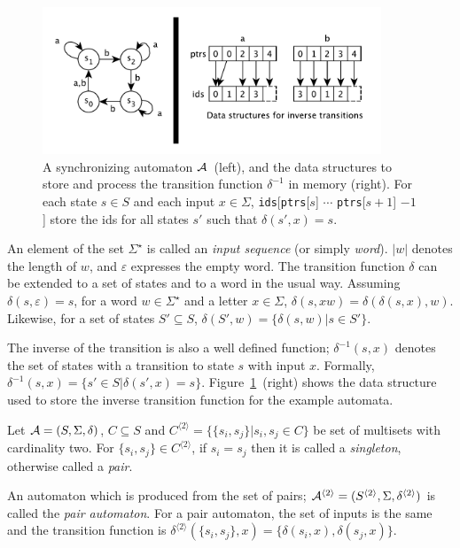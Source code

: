\documentclass[12pt]{article}
\begin{document}
\begin{figure}[ht]
	\centering
	\includegraphics[width=0.9\textwidth]{figs/inverse.pdf}
	\caption{A synchronizing automaton ${\cal A}$~(left), and the data structures to store and process the transition function $\delta^{-1}$  in memory (right).
	For each state $s \in S$ and each input $x \in \Sigma$, {\tt ids}[{\tt ptrs}[$s$] $\cdots$ {\tt ptrs}[$s+1$] $ - 1$] store the ids for all states $s'$ such that $\delta(s',x) = s$.}
	\label{fig:inv}
\end{figure}

An element of the set $\Sigma^\star$ is called an {\em input sequence} (or simply {\em word}). $|w|$ denotes the length of $w$, and $\varepsilon$ expresses the empty word. The transition function $\delta$ can be extended to a set of states and to a word in the usual way. Assuming $\delta(s,\varepsilon)=s$, for a word $w \in \Sigma^\star$ and a letter $x \in \Sigma$, $\delta(s,xw) = \delta(\delta(s,x),w)$. Likewise, for a set of states $S' \subseteq S$, $\delta(S',w) = \{ \delta(s,w) | s \in S'\}$.

The inverse of the transition is also a well defined function; $\delta^{-1}(s,x)$ denotes the set of states with a transition to state $s$ with input $x$. Formally, $\delta^{-1}(s,x) = \{ s' \in S | \delta(s',x)= s\}$.  Figure~\ref{fig:inv}~(right) shows the data structure used to store the inverse transition function for the example automata.

Let ${\cal A}=(S, \Sigma, \delta)$, $C \subseteq S$ and $C^{\langle 2 \rangle} = \{ \{ s_i, s_j \}| s_i,s_j \in C \}$ be set of multisets  with cardinality two. For $\{ s_i, s_j \} \in C^{\langle 2 \rangle}$, if $s_i=s_j$ then it is called a \textit{singleton}, otherwise called a \textit{pair}. 

An automaton which is produced from the set of pairs; ${\cal A}^{\langle 2 \rangle}=(S^{\langle 2 \rangle},\Sigma,\delta^{\langle 2 \rangle})$ is called the \textit{pair automaton}. 
For a pair automaton, the set of inputs is the same and the transition function is $\delta^{\langle 2 \rangle}(\{ s_i,s_j \},x) = \{ \delta(s_i,x), \delta(s_j,x) \}$. 
\end{document}
